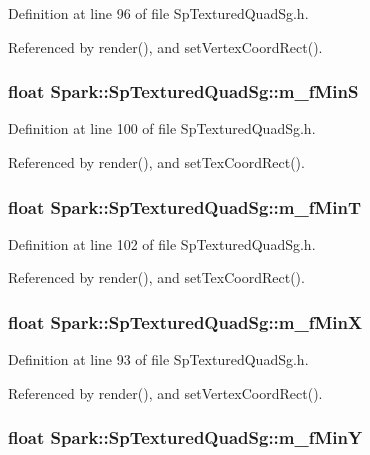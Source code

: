Definition at line 96 of file Sp\-Textured\-Quad\-Sg.h.

Referenced by render(), and set\-Vertex\-Coord\-Rect().
\subsubsection{\setlength{\rightskip}{0pt plus 5cm}float {\bf Spark::Sp\-Textured\-Quad\-Sg::m\_\-f\-Min\-S}\hspace{0.3cm}{\tt  [protected]}}\label{classSpark_1_1SpTexturedQuadSg_p5}


Definition at line 100 of file Sp\-Textured\-Quad\-Sg.h.

Referenced by render(), and set\-Tex\-Coord\-Rect().
\subsubsection{\setlength{\rightskip}{0pt plus 5cm}float {\bf Spark::Sp\-Textured\-Quad\-Sg::m\_\-f\-Min\-T}\hspace{0.3cm}{\tt  [protected]}}\label{classSpark_1_1SpTexturedQuadSg_p7}


Definition at line 102 of file Sp\-Textured\-Quad\-Sg.h.

Referenced by render(), and set\-Tex\-Coord\-Rect().
\subsubsection{\setlength{\rightskip}{0pt plus 5cm}float {\bf Spark::Sp\-Textured\-Quad\-Sg::m\_\-f\-Min\-X}\hspace{0.3cm}{\tt  [protected]}}\label{classSpark_1_1SpTexturedQuadSg_p0}


Definition at line 93 of file Sp\-Textured\-Quad\-Sg.h.

Referenced by render(), and set\-Vertex\-Coord\-Rect().
\subsubsection{\setlength{\rightskip}{0pt plus 5cm}float {\bf Spark::Sp\-Textured\-Quad\-Sg::m\_\-f\-Min\-Y}\hspace{0.3cm}{\tt  [protected]}}\label{classSpark_1_1SpTexturedQuadSg_p1}


